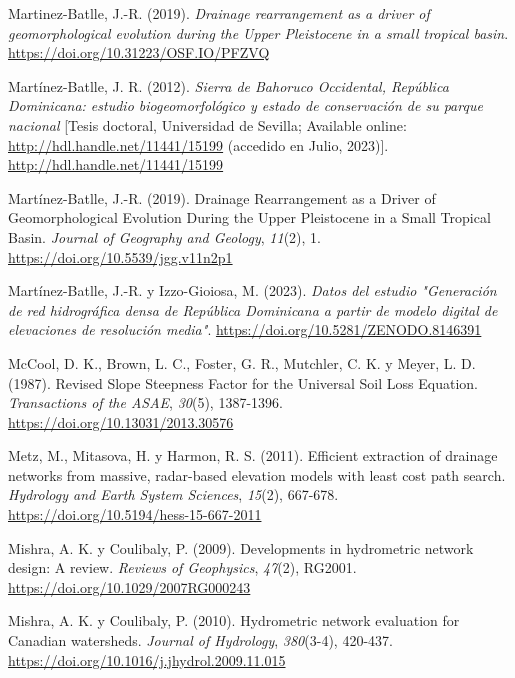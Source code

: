 \documentclass[spanish]{article}
\newlength{\cslhangindent}
\newlength{\cslentryspacingunit} %
\newenvironment{CSLReferences}[2] %
 {%
  \setlength{\parindent}{0pt}
  \ifodd #1
  \let\oldpar\par
  \def\par{\hangindent=\cslhangindent\oldpar}
  \fi
  \setlength{\parskip}{#2\cslentryspacingunit}
 }%
 {}
\begin{document}
\begin{CSLReferences}{1}{0}
\leavevmode{}%
Martinez-Batlle, J.-R. (2019). \emph{Drainage rearrangement as a driver
of geomorphological evolution during the Upper Pleistocene in a small
tropical basin}. \url{https://doi.org/10.31223/OSF.IO/PFZVQ}

\leavevmode{}%
Martínez-Batlle, J. R. (2012). \emph{{Sierra de Bahoruco Occidental,
República Dominicana: estudio biogeomorfológico y estado de conservación
de su parque nacional}} {[}Tesis doctoral, Universidad de Sevilla;
Available online: \url{http://hdl.handle.net/11441/15199} (accedido en
Julio, 2023){]}. \url{http://hdl.handle.net/11441/15199}

\leavevmode{}%
Martínez-Batlle, J.-R. (2019). Drainage Rearrangement as a Driver of
Geomorphological Evolution During the Upper Pleistocene in a Small
Tropical Basin. \emph{Journal of Geography and Geology}, \emph{11}(2),
1. \url{https://doi.org/10.5539/jgg.v11n2p1}

\leavevmode{}%
Martínez-Batlle, J.-R. y Izzo-Gioiosa, M. (2023). \emph{Datos del
estudio "Generación de red hidrográfica densa de República Dominicana a
partir de modelo digital de elevaciones de resolución media"}.
\url{https://doi.org/10.5281/ZENODO.8146391}

\leavevmode{}%
McCool, D. K., Brown, L. C., Foster, G. R., Mutchler, C. K. y Meyer, L.
D. (1987). Revised Slope Steepness Factor for the Universal Soil Loss
Equation. \emph{Transactions of the ASAE}, \emph{30}(5), 1387-1396.
\url{https://doi.org/10.13031/2013.30576}

\leavevmode{}%
Metz, M., Mitasova, H. y Harmon, R. S. (2011). Efficient extraction of
drainage networks from massive, radar-based elevation models with least
cost path search. \emph{Hydrology and Earth System Sciences},
\emph{15}(2), 667-678. \url{https://doi.org/10.5194/hess-15-667-2011}

\leavevmode{}%
Mishra, A. K. y Coulibaly, P. (2009). Developments in hydrometric
network design: A review. \emph{Reviews of Geophysics}, \emph{47}(2),
RG2001. \url{https://doi.org/10.1029/2007RG000243}

\leavevmode{}%
Mishra, A. K. y Coulibaly, P. (2010). Hydrometric network evaluation for
Canadian watersheds. \emph{Journal of Hydrology}, \emph{380}(3-4),
420-437. \url{https://doi.org/10.1016/j.jhydrol.2009.11.015}


\end{CSLReferences}
\end{document}

